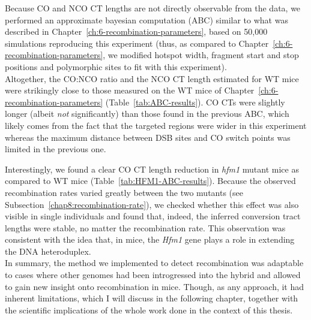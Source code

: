 Because CO and NCO CT lengths are not directly observable from the data, we performed an approximate bayesian computation (ABC) similar to what was described in Chapter~\ref{ch:6-recombination-parameters}, based on 50,000 simulations reproducing this experiment (thus, as compared to Chapter~\ref{ch:6-recombination-parameters}, we modified hotspot width, fragment start and stop positions and polymorphic sites to fit with this experiment).\\




Altogether, the CO:NCO ratio and the NCO CT length estimated for WT mice were strikingly close to those measured on the WT mice of Chapter~\ref{ch:6-recombination-parameters} (Table~\ref{tab:ABC-results}).
CO CTs were slightly longer (albeit \textit{not} significantly) than those found in the previous ABC, which likely comes from the fact that the targeted regions were wider in this experiment whereas the maximum distance between DSB sites and CO switch points was limited in the previous one.

Interestingly, we found a clear CO CT length reduction in \textit{hfm1} mutant mice as compared to WT mice (Table~\ref{tab:HFM1-ABC-results}).
Because the observed recombination rates varied greatly between the two mutants (see Subsection~\ref{chap8:recombination-rate}), we checked whether this effect was also visible in single individuals and found that, indeed, the inferred conversion tract lengths were stable, no matter the recombination rate.
This observation was consistent with the idea that, in mice, the \textit{Hfm1} gene plays a role in extending the DNA heteroduplex.\\


In summary, the method we implemented to detect recombination was adaptable to cases where other genomes had been introgressed into the hybrid and allowed to gain new insight onto recombination in mice.
Though, as any approach, it had inherent limitations, which I will discuss in the following chapter, together with the scientific implications of the whole work done in the context of this thesis.



